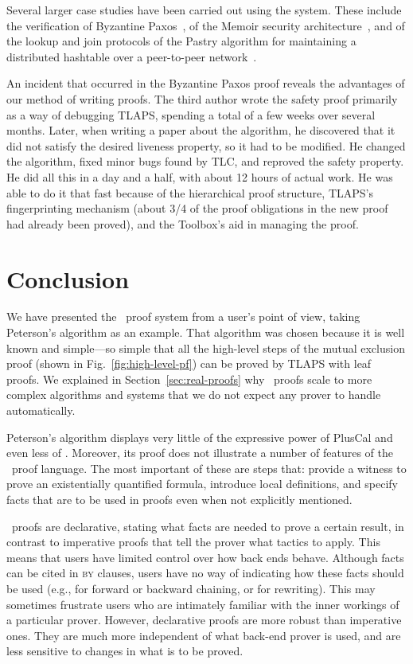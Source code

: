 \documentclass[a4paper]{llncs}
\begin{document}
Several larger case studies have been carried out using the system.
These include the verification of Byzantine
Paxos~\cite{lamport:byzantine-paxos}, of the Memoir security
architecture~\cite{parno:memoir}, and of the lookup and join protocols
of the Pastry algorithm for maintaining a distributed hashtable over a
peer-to-peer network~\cite{lu:pastry}.

An incident that occurred in the Byzantine Paxos proof reveals the
advantages of our method of writing proofs.  The third author wrote
the safety proof primarily as a way of debugging TLAPS, spending a
total of a few weeks over several months.  Later, when writing a
paper about the algorithm, he discovered that it did not satisfy the
desired liveness property, so it had to be modified.  He changed the
algorithm, fixed minor bugs found by TLC, and reproved the safety
property.  He did all this in a day and a half, with about 12 hours of
actual work.  He was able to do it that fast because of the
hierarchical proof structure, TLAPS's fingerprinting mechanism (about
3/4 of the proof obligations in the new proof had already been
proved), and the Toolbox's aid in managing the proof.



\section{Conclusion}
\label{sec:conclusion}


We have presented the \tlaplus\ proof system from a user's point of
view, taking Peterson's algorithm as an example.  That algorithm was
chosen because it is well known and simple---so simple that all the
high-level steps of the mutual exclusion proof (shown in
Fig.~\ref{fig:high-level-pf}) can be proved by TLAPS with leaf proofs.
We explained in Section~\ref{sec:real-proofs} why \tlaplus\ proofs
scale to more complex algorithms and systems that we do not expect any
prover to handle automatically.

Peterson's algorithm displays very little of the expressive power of
PlusCal and even less of \tlaplus.  Moreover, its proof does not
illustrate a number of features of the \tlaplus\ proof language.  The
most important of these are steps that: provide a witness to prove an
existentially quantified formula, introduce local definitions, and
specify facts that are to be used in proofs even when not explicitly
mentioned.

\tlaplus\ proofs are declarative, stating what facts are needed to
prove a certain result, in contrast to imperative proofs that tell the
prover what tactics to apply.  This means that users have limited
control over how back ends behave.  Although facts can be cited in
\textsc{by} clauses, users have no way of indicating how these facts
should be used (e.g., for forward or backward chaining, or for
rewriting).  This may sometimes frustrate users who are intimately
familiar with the inner workings of a particular prover.  However,
declarative proofs are more robust than imperative ones.
They are much more independent of what back-end prover is used, and
are less sensitive to changes in what is to be proved.
\end{document}
